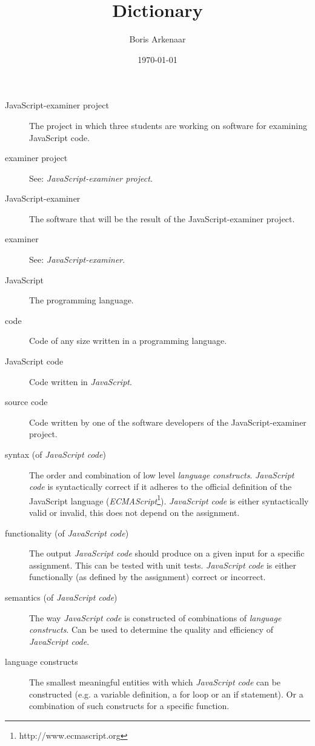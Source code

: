 \documentclass{article}
\begin{document}
\title{Dictionary}
\author{Boris Arkenaar}
\date{\today}
\maketitle

\begin{description}
  \item[JavaScript-examiner project] The project in which three students are
    working on software for examining JavaScript code.
  \item[examiner project] See: {\em JavaScript-examiner project}.
  \item[JavaScript-examiner] The software that will be the result of the
    JavaScript-examiner project.
  \item[examiner] See: {\em JavaScript-examiner}.
  \item[JavaScript] The programming language.
  \item[code] Code of any size written in a programming language.
  \item[JavaScript code] Code written in {\em JavaScript}.
  \item[source code] Code written by one of the software developers of the
    JavaScript-examiner project.
  \item[syntax (of {\em JavaScript code})] The order and combination of low
    level {\em language constructs}. {\em JavaScript code} is syntactically
    correct if it adheres to the official definition of the JavaScript language
    ({\em ECMAScript}\footnote{http://www.ecmascript.org}). {\em JavaScript
    code} is either syntactically valid or invalid, this does not depend on the
    assignment.
  \item[functionality (of {\em JavaScript code})] The output {\em JavaScript
    code} should produce on a given input for a specific assignment. This can
    be tested with unit tests. {\em JavaScript code} is either functionally (as
    defined by the assignment) correct or incorrect.
  \item[semantics (of {\em JavaScript code})] The way {\em JavaScript code} is
    constructed of combinations of {\em language constructs}. Can be used to
    determine the quality and efficiency of {\em JavaScript code}.
  \item[language constructs] The smallest meaningful entities with which {\em
    JavaScript code} can be constructed (e.g. a variable definition, a for loop
    or an if statement). Or a combination of such constructs for a specific
    function.

\end{description}
\end{document}
